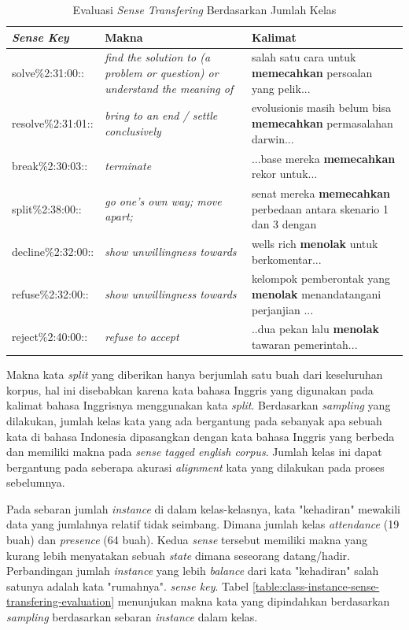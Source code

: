 \begin{table}
	\centering
	\caption{Evaluasi \textit{Sense Transfering} Berdasarkan Jumlah Kelas}
	\label{table:number-classes-sense-transfering-evaluation}
	\begin{tabular}{|p{4cm}|p{4cm}|p{4cm}|}
		\hline
		\textit{Sense Key} & Makna & Kalimat
		\\ \hline
		solve\%2:31:00::  & 
		\textit{find the solution to (a problem or question) or understand the meaning of}   & 
		salah satu cara untuk \textbf{memecahkan} persoalan yang pelik...
		\\ \hline
		resolve\%2:31:01:: & 
		\textit{bring to an end / settle conclusively}   & 
		evolusionis masih belum bisa \textbf{memecahkan} permasalahan darwin...
		\\ \hline
		break\%2:30:03:: & 
		\textit{terminate}   & 
		...base mereka \textbf{memecahkan} rekor untuk...
		\\ \hline
		split\%2:38:00:: &
		\textit{go one's own way; move apart;} &
		senat mereka \textbf{memecahkan} perbedaan antara skenario 1 dan 3 dengan
		\\ \hline
		decline\%2:32:00:: &
		\textit{show unwillingness towards} &
		wells rich \textbf{menolak} untuk berkomentar...
		\\ \hline
		refuse\%2:32:00:: &
		\textit{show unwillingness towards} &
		kelompok pemberontak yang \textbf{menolak} menandatangani perjanjian ...
		\\ \hline
		reject\%2:40:00:: &
		\textit{refuse to accept} &
		..dua pekan lalu \textbf{menolak} tawaran pemerintah...
		\\ \hline
	\end{tabular}
\end{table}

Makna kata \textit{split} yang diberikan hanya berjumlah satu buah dari keseluruhan korpus, hal ini disebabkan karena kata bahasa Inggris yang digunakan pada kalimat bahasa Inggrisnya menggunakan kata \textit{split}. Berdasarkan \textit{sampling} yang dilakukan, jumlah kelas kata yang ada bergantung pada sebanyak apa sebuah kata di bahasa Indonesia dipasangkan dengan kata bahasa Inggris yang berbeda dan memiliki makna pada \textit{sense tagged english corpus}. Jumlah kelas ini dapat bergantung pada seberapa akurasi \textit{alignment} kata yang dilakukan pada proses sebelumnya.

Pada sebaran jumlah \textit{instance} di dalam kelas-kelasnya, kata "kehadiran" mewakili data yang jumlahnya relatif tidak seimbang. Dimana jumlah kelas \textit{attendance} (19 buah) dan \textit{presence} (64 buah). Kedua \textit{sense} tersebut memiliki makna yang kurang lebih menyatakan sebuah \textit{state} dimana seseorang datang/hadir. Perbandingan jumlah \textit{instance} yang lebih \textit{balance} dari kata "kehadiran" salah satunya adalah kata "rumahnya". \textit{sense key}. Tabel \ref{table:class-instance-sense-transfering-evaluation} menunjukan makna kata yang dipindahkan berdasarkan \textit{sampling} berdasarkan sebaran \textit{instance} dalam kelas.

